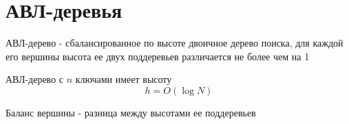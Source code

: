 \documentclass[discrete.tex]{subfiles}
\begin{document}
\section{АВЛ-деревья}

\begin{definition}
    АВЛ-дерево - сбалансированное по высоте двоичное дерево поиска, для каждой его вершины
    высота ее двух поддеревьев различается не более чем на 1
\end{definition}

\begin{theorem}
    АВЛ-дерево с $n$ ключами имеет высоту 
    \[h = O(\log N)\]
\end{theorem}

\begin{definition}
    Баланс вершины - разница между высотами ее поддеревьев 
\end{definition}
\end{document}
